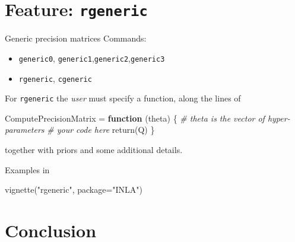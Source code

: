 \documentclass[
  ignorenonframetext,
  handout]{beamer}
\newenvironment{Shaded}{\begin{snugshade}}{\end{snugshade}}
\newcommand{\AttributeTok}[1]{\textcolor[rgb]{0.77,0.63,0.00}{#1}}
\newcommand{\CommentTok}[1]{\textcolor[rgb]{0.56,0.35,0.01}{\textit{#1}}}
\newcommand{\ControlFlowTok}[1]{\textcolor[rgb]{0.13,0.29,0.53}{\textbf{#1}}}
\newcommand{\FunctionTok}[1]{\textcolor[rgb]{0.00,0.00,0.00}{#1}}
\newcommand{\NormalTok}[1]{#1}
\newcommand{\OtherTok}[1]{\textcolor[rgb]{0.56,0.35,0.01}{#1}}
\newcommand{\StringTok}[1]{\textcolor[rgb]{0.31,0.60,0.02}{#1}}
\begin{document}
\hypertarget{feature-rgeneric}{%
\section{\texorpdfstring{Feature:
\texttt{rgeneric}}{Feature: rgeneric}}\label{feature-rgeneric}}

\begin{frame}[fragile]{Generic precision matrices}
\protect\hypertarget{generic-precision-matrices}{}
Commands:

\begin{itemize}
\item
  \texttt{generic0},
  \texttt{generic1},\texttt{generic2},\texttt{generic3}
\item
  \texttt{rgeneric}, \texttt{cgeneric}
\end{itemize}

For \texttt{rgeneric} the \emph{user} must specify a function, along the
lines of

\begin{Shaded}
\begin{Highlighting}[]
\NormalTok{ComputePrecisionMatrix }\OtherTok{=} \ControlFlowTok{function}\NormalTok{ (theta) \{}
  \CommentTok{\# theta is the vector of hyper{-}parameters}
  \CommentTok{\# your code here}
  \FunctionTok{return}\NormalTok{(Q)}
\NormalTok{\}}
\end{Highlighting}
\end{Shaded}

together with priors and some additional details.

Examples in

\begin{Shaded}
\begin{Highlighting}[]
\FunctionTok{vignette}\NormalTok{(}\StringTok{"rgeneric"}\NormalTok{, }\AttributeTok{package=}\StringTok{"INLA"}\NormalTok{)}
\end{Highlighting}
\end{Shaded}
\end{frame}

\hypertarget{conclusion}{%
\section{Conclusion}\label{conclusion}}
\end{document}
